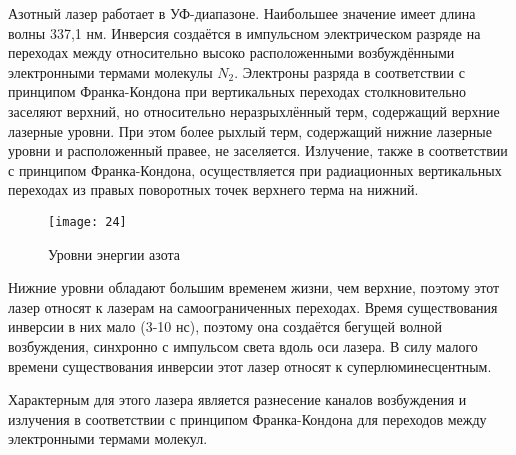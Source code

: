 Азотный лазер работает в УФ-диапазоне. Наибольшее значение имеет длина волны 
337,1 нм. Инверсия создаётся в импульсном электрическом разряде на переходах 
между относительно высоко расположенными возбуждёнными электронными термами 
молекулы \( N_2 \). Электроны разряда в соответствии с принципом 
Франка-Кондона при вертикальных переходах столкновительно заселяют верхний, 
но относительно неразрыхлённый терм, содержащий верхние лазерные уровни. При 
этом более рыхлый терм, содержащий нижние лазерные уровни и расположенный 
правее, не заселяется. Излучение, также в соответствии с принципом 
Франка-Кондона, осуществляется при радиационных вертикальных переходах из 
правых поворотных точек верхнего терма на нижний.

\begin{figure}[h]
    \center
    \texttt{[image: 24]}
    \caption{Уровни энергии азота}
\end{figure}

Нижние уровни обладают большим временем жизни, чем верхние, поэтому этот лазер 
относят к лазерам на самоограниченных переходах. Время существования инверсии 
в них мало (3-10 нс), поэтому она создаётся бегущей волной возбуждения, 
синхронно с импульсом света вдоль оси лазера. В силу малого времени 
существования инверсии этот лазер относят к суперлюминесцентным.

Характерным для этого лазера является разнесение каналов возбуждения и 
излучения в соответствии с принципом Франка-Кондона для переходов между 
электронными термами молекул.